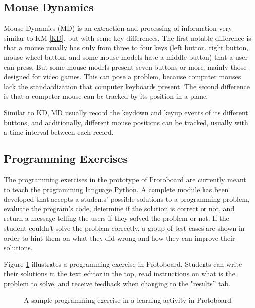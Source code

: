\documentclass{acm_proc_article-sp}
\begin{document}

\subsection{Mouse Dynamics}

Mouse Dynamics (MD) is an extraction and processing of information
very similar to KM \ref{KD}, but with some key differences. The first
notable difference is that a mouse usually has only from three to four
keys (left button, right button, mouse wheel button, and some mouse
models have a middle button) that a user can press. But some mouse
models present seven buttons or more, mainly those designed for video
games. This can pose a problem, because computer mouses lack the
standardization that computer keyboards present. The second difference 
is that a computer mouse can be tracked by its position in a plane.

Similar to KD, MD usually record the keydown and keyup events of its
different buttons, and additionally, different mouse positions can be
tracked, usually with a time interval between each record.


\subsection{Programming Exercises}

The programming exercises in the prototype of Protoboard are currently
meant to teach the programming language Python. A complete module has
been developed that accepts a students' possible solutions to a
programming problem, evaluate the program's code, determine if the
solution is correct or not, and return a message telling the users if
they solved the problem or not. If the student couldn't solve
the problem correctly, a group of test cases are shown in order to hint them
on what they did wrong and how they can improve their solutions.

Figure \ref{fig:exercise} illustrates a programming exercise in
Protoboard. Students can write their solutions in the text editor
in the top, read instructions on what is the problem to solve, and
receive feedback when changing to the "results'' tab.

\begin{figure}
  \centering
  \caption{A sample programming exercise in a learning activity in Protoboard}
  \label{fig:exercise}
\end{figure}
\end{document}
